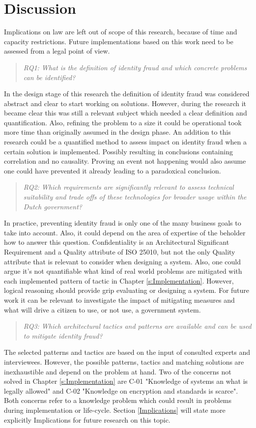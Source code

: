 \chapter{Discussion}\label{s:discussion}
Implications on law are left out of scope of this research, because of time and capacity restrictions. Future implementations based on this work need to be assessed from a legal point of view.

\begin{quote}\emph{RQ1: What is the definition of identity fraud and which concrete problems can be identified?}\end{quote}
In the design stage of this research the definition of identity fraud was considered abstract and clear to start working on solutions. However, during the research it became clear this was still a relevant subject which needed a clear definition and quantification. Also, refining the problem to a size it could be operational took more time than originally assumed in the design phase. An addition to this research could be a quantified method to assess impact on identity fraud when a certain solution is implemented. Possibly resulting in conclusions containing correlation and no causality. Proving an event not happening would also assume one could have prevented it already leading to a paradoxical conclusion.

\begin{quote}\emph{RQ2: Which requirements are significantly relevant to assess technical suitability and trade offs of these technologies for broader usage within the Dutch government?}\end{quote}
In practice, preventing identity fraud is only one of the many business goals to take into account. Also, it could depend on the area of expertise of the beholder how to answer this question. Confidentiality is an Architectural Significant Requirement and a Quality attribute of ISO 25010, but not the only Quality attribute that is relevant to consider when designing a system. Also, one could argue it's not quantifiable what kind of real world problems are mitigated with each implemented pattern of tactic in Chapter \ref{s:Implementation}. However, logical reasoning should provide grip evaluating or designing a system. For future work it can be relevant to investigate the impact of mitigating measures and what will drive a citizen to use, or not use, a government system.

\begin{quote}\emph{RQ3: Which architectural tactics and patterns are available and can be used to mitigate identity fraud?}\end{quote}
The selected patterns and tactics are based on the input of consulted experts and interviewees. However, the possible patterns, tactics and matching solutions are inexhaustible and depend on the problem at hand. Two of the concerns not solved in Chapter \ref{s:Implementation} are C-01 "Knowledge of systems an what is legally allowed" and C-02 "Knowledge on encryption and standards is scarce". Both concerns refer to a knowledge problem which could result in problems during implementation or life-cycle. Section \ref{Implications} will state more explicitly  Implications for future research on this topic.

